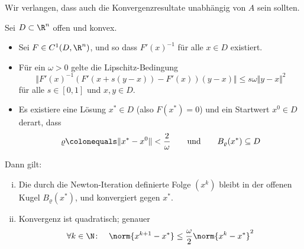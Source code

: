 Wir verlangen, dass auch die Konvergenzresultate unabhängig von $A$ sein sollten.
\begin{satz}
Sei $D \subset \R^n$ offen und konvex.
\begin{itemize}
 \item Sei $F \in C^1(D, \R^n)$, und so dass $F'(x)^{-1}$ für alle $x \in D$ existiert.

 \item Für ein $\omega>0$ gelte die Lipschitz-Bedingung
 \begin{equation*}
  \Vert F'(x)^{-1} (F'(x+s(y-x)) -F'(x) ) (y-x) \Vert \leq s \omega \Vert y-x \Vert^2
\end{equation*}
für alle $s \in [0,1]$ und $x,y \in D$.

 \item Es existiere eine Lösung $x^* \in D$ (also $F(x^*)=0$) und ein Startwert $x^0 \in D$ derart, dass
  \begin{equation*}
   \varrho \colonequals \Vert x^*-x^0 \Vert < \frac{2}{\omega} \qquad \mathrm{und} \qquad B_{\varrho} ( x^* ) \subseteq D
  \end{equation*}
\end{itemize}
Dann gilt:
\begin{enumerate}[i)]
 \item Die durch die Newton-Iteration definierte Folge $(x^k)$ bleibt in der
    offenen Kugel $B_{\varrho} (x^*)$, und konvergiert gegen $x^*$.

 \item Konvergenz ist quadratisch; genauer
  \begin{equation*}
   \forall k \in \N \colon \quad \norm{x^{k+1}-x^*} \leq \frac{\omega}{2} \norm{x^k-x^*}^2
  \end{equation*}
\end{enumerate}
\end{satz}


